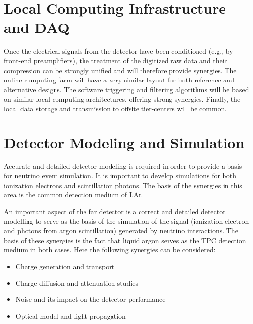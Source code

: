 \section{Local Computing Infrastructure and DAQ}

Once the electrical signals from the detector have been conditioned 
(e.g., by front-end preamplifiers), the treatment of the digitized raw data and
their compression can be strongly unified and will therefore provide
synergies. The online computing farm will have a very similar layout
for both reference and alternative designs. The software triggering and
filtering algorithms will be based on similar local computing
architectures, offering strong synergies. Finally, the local data
storage and transmission to offsite tier-centers will be common.


\section{Detector Modeling and Simulation}

Accurate and detailed detector modeling is required in order to provide a 
basis for neutrino event simulation. It is important to develop simulations for both ionization 
electrons and scintillation photons. The basis of the synergies in this area is
the common detection medium of LAr.

An important aspect of the far detector is a correct and detailed
detector modelling to serve as the basis of the simulation of the
signal (ionization electron and photons from argon scintillation)
generated by neutrino interactions. The basis of these synergies is
the fact that liquid argon serves as the TPC detection medium in both
cases. Here the following synergies can be considered:

\begin{itemize}
\item Charge generation and transport
\item Charge diffusion and attenuation studies
\item Noise and its impact on the detector performance
\item Optical model and light propagation
\end{itemize}

